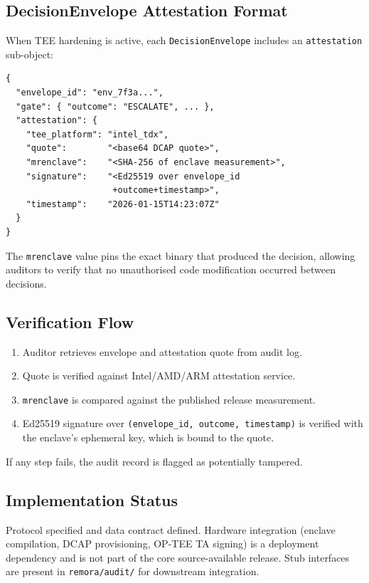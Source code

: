 \documentclass[10pt,twocolumn]{article}
\begin{document}
\subsection{DecisionEnvelope Attestation Format}

When TEE hardening is active, each \texttt{DecisionEnvelope} includes an
\texttt{attestation} sub-object:

\begin{lstlisting}
{
  "envelope_id": "env_7f3a...",
  "gate": { "outcome": "ESCALATE", ... },
  "attestation": {
    "tee_platform": "intel_tdx",
    "quote":        "<base64 DCAP quote>",
    "mrenclave":    "<SHA-256 of enclave measurement>",
    "signature":    "<Ed25519 over envelope_id
                     +outcome+timestamp>",
    "timestamp":    "2026-01-15T14:23:07Z"
  }
}
\end{lstlisting}

The \texttt{mrenclave} value pins the exact binary that produced the decision,
allowing auditors to verify that no unauthorised code modification occurred
between decisions.

\subsection{Verification Flow}

\begin{enumerate}
  \item Auditor retrieves envelope and attestation quote from audit log.
  \item Quote is verified against Intel/AMD/ARM attestation service.
  \item \texttt{mrenclave} is compared against the published release measurement.
  \item Ed25519 signature over \texttt{(envelope\_id, outcome, timestamp)} is
        verified with the enclave's ephemeral key, which is bound to the quote.
\end{enumerate}

If any step fails, the audit record is flagged as potentially tampered.

\subsection{Implementation Status}

Protocol specified and data contract defined. Hardware integration (enclave
compilation, DCAP provisioning, OP-TEE TA signing) is a deployment
dependency and is not part of the core source-available release. Stub interfaces
are present in \texttt{remora/audit/} for downstream integration.
\end{document}
